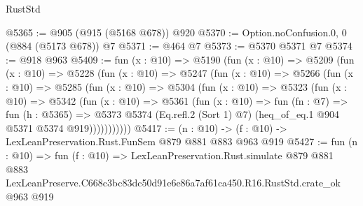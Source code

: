 \begin{lexlean}{RustStd}
\begin{coremodule}
@5365 := @905 (@915 (@5168 @678)) @920
@5370 := Option.noConfusion.{0, 0} (@884 (@5173 @678)) @7
@5371 := @464 @7
@5373 := @5370 @5371 @7
@5374 := @918 @963
@5409 := fun (x : @10) =>
  @5190
    (fun (x : @10) =>
    @5209
      (fun (x : @10) =>
      @5228
        (fun (x : @10) =>
        @5247
          (fun (x : @10) =>
          @5266
            (fun (x : @10) =>
            @5285
              (fun (x : @10) =>
              @5304
                (fun (x : @10) =>
                @5323
                  (fun (x : @10) =>
                  @5342
                    (fun (x : @10) =>
                    @5361
                      (fun (x : @10) =>
                      fun (fn : @7) =>
                      fun (h : @5365) =>
                      @5373
                        @5374
                        (Eq.refl.{2} (Sort 1) @7)
                        (heq_of_eq.{1} @904 @5371 @5374 @919)))))))))))
@5417 := (n : @10) -> (f : @10) -> LexLeanPreservation.Rust.FunSem @879 @881 @883 @963 @919
@5427 := fun (n : @10) =>
  fun (f : @10) =>
  LexLeanPreservation.Rust.simulate
    @879
    @881
    @883
    LexLeanPreserve.C668c3bc83dc50d91e6e86a7af61ca450.R16.RustStd.crate_ok
    @963
    @919
\end{coremodule}
\end{lexlean}
